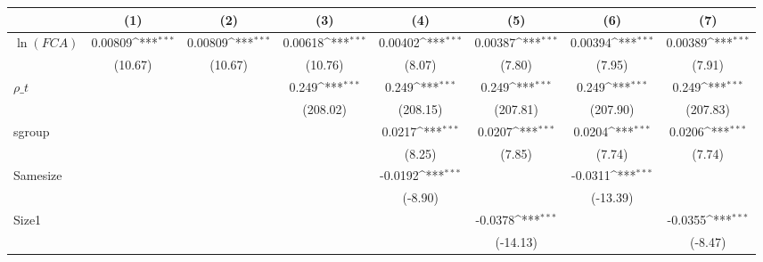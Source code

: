 {
\def\sym#1{\ifmmode^{#1}\else\(^{#1}\)\fi}
\begin{tabular}{l*{7}{c}}
\hline\hline
                    &\multicolumn{1}{c}{(1)}         &\multicolumn{1}{c}{(2)}         &\multicolumn{1}{c}{(3)}         &\multicolumn{1}{c}{(4)}         &\multicolumn{1}{c}{(5)}         &\multicolumn{1}{c}{(6)}         &\multicolumn{1}{c}{(7)}         \\
\hline
$\ln(FCA)$          &     0.00809\sym{***}&     0.00809\sym{***}&     0.00618\sym{***}&     0.00402\sym{***}&     0.00387\sym{***}&     0.00394\sym{***}&     0.00389\sym{***}\\
                    &     (10.67)         &     (10.67)         &     (10.76)         &      (8.07)         &      (7.80)         &      (7.95)         &      (7.91)         \\
[1em]
$ \rho\_t $          &                     &                     &       0.249\sym{***}&       0.249\sym{***}&       0.249\sym{***}&       0.249\sym{***}&       0.249\sym{***}\\
                    &                     &                     &    (208.02)         &    (208.15)         &    (207.81)         &    (207.90)         &    (207.83)         \\
[1em]
sgroup              &                     &                     &                     &      0.0217\sym{***}&      0.0207\sym{***}&      0.0204\sym{***}&      0.0206\sym{***}\\
                    &                     &                     &                     &      (8.25)         &      (7.85)         &      (7.74)         &      (7.74)         \\
[1em]
Samesize            &                     &                     &                     &     -0.0192\sym{***}&                     &     -0.0311\sym{***}&                     \\
                    &                     &                     &                     &     (-8.90)         &                     &    (-13.39)         &                     \\
[1em]
Size1               &                     &                     &                     &                     &     -0.0378\sym{***}&                     &     -0.0355\sym{***}\\
                    &                     &                     &                     &                     &    (-14.13)         &                     &     (-8.47)         \\

\end{tabular}}
